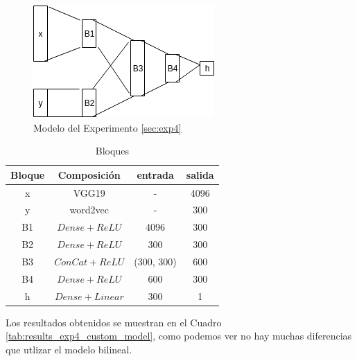 \begin{figure}
\begin{center}
    \includegraphics[width=\textwidth]{images/experiment4_model.png}
    \caption{Modelo del Experimento \ref{sec:exp4}}
    \label{fig:exp4_custom_model}
\end{center}
\end{figure}

\begin{table}[ht]
    \centering
    \begin{tabular}{|c|c|c|c|}
        \hline
        \textbf{Bloque} &
        \textbf{Composición} &
        \textbf{entrada} &
        \textbf{salida} \\
        \hline \hline
        x & VGG19 & - & 4096 \\
        y & word2vec & - & 300  \\
        B1 & $Dense + ReLU $ & 4096 & 300    \\
        B2 & $Dense + ReLU$ & 300 & 300  \\
        B3 & $ConCat + ReLU$ & (300, 300) & 600  \\
        B4 & $Dense + ReLU$ & 600 & 300 \\
        h  & $Dense + Linear$ & 300 & 1 \\
        \hline
    \end{tabular}
    \caption{Bloques}
    \label{tab:bloques_exp4_custom_model}
\end{table}

Los resultados obtenidos se muestran en el Cuadro \ref{tab:results_exp4_custom_model}, como podemos ver no hay muchas diferencias que utlizar el modelo bilineal.

